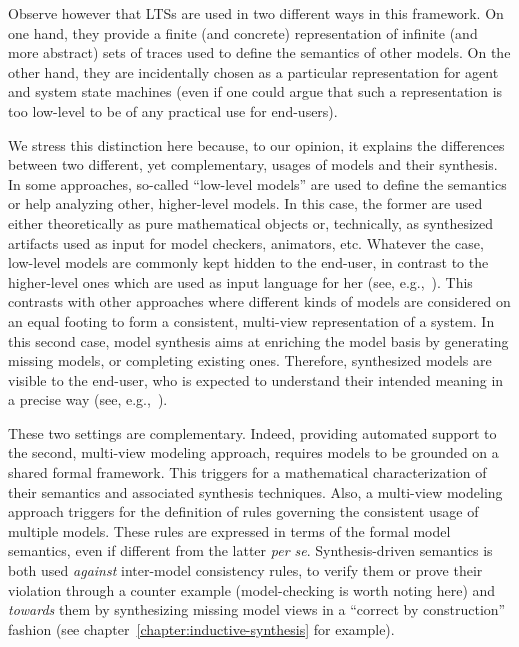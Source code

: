 Observe however that LTSs are used in two different ways in this framework. On one hand, they provide a finite (and concrete) representation of infinite (and more abstract) sets of traces used to define the semantics of other models. On the other hand, they are incidentally chosen as a particular representation for agent and system state machines (even if one could argue that such a representation is too low-level to be of any practical use for end-users). 

We stress this distinction here because, to our opinion, it explains the differences between two different, yet complementary, usages of models and their synthesis. In some approaches, so-called ``low-level models'' are used to define the semantics or help analyzing other, higher-level models. In this case, the former are used either theoretically as pure mathematical objects or, technically, as synthesized artifacts used as input for model checkers, animators, etc. Whatever the case, low-level models are commonly kept hidden to the end-user, in contrast to the higher-level ones which are used as input language for her (see, e.g.,~\cite{Magee:1997, Uchitel:2003, Damas:2009}). This contrasts with other approaches where different kinds of models are considered on an equal footing to form a consistent, multi-view representation of a system. In this second case, model synthesis aims at enriching the model basis by generating missing models, or completing existing ones. Therefore, synthesized models are visible to the end-user, who is expected to understand their intended meaning in a precise way (see, e.g.,~\cite{VanLamsweerde:1998, Whittle:2000, Uchitel:2004, Damas:2005}).

These two settings are complementary. Indeed, providing automated support to the second, multi-view modeling approach, requires models to be grounded on a shared formal framework. This triggers for a mathematical characterization of their semantics and associated synthesis techniques. Also, a multi-view modeling approach triggers for the definition of rules governing the consistent usage of multiple models. These rules are expressed in terms of the formal model semantics, even if different from the latter \emph{per se}. Synthesis-driven semantics is both used \emph{against} inter-model consistency rules, to verify them or prove their violation through a counter example (model-checking is worth noting here) and \emph{towards} them by synthesizing missing model views in a ``correct by construction'' fashion (see chapter~\ref{chapter:inductive-synthesis} for example).

